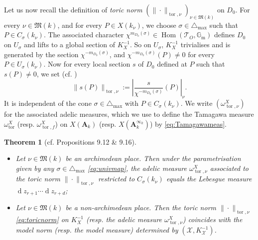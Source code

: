 \documentclass[11pt,letterpaper]{amsart}
\newcommand{\BG}{{\mathbb {G}}}
\newcommand{\CT}{{\mathcal {T}}}
\newcommand{\CX}{{\mathcal {X}}}
\newcommand{\RA}{{\mathbf {A}}}
\newcommand{\Hom}{\operatorname{Hom}}
\theoremstyle{plain}
\numberwithin{equation}{section}
\newtheorem{theorem}{Theorem}[section]
\theoremstyle{definition}
\theoremstyle{remark}
\begin{document}
Let us now recall the definition of \emph{toric norm} $(\|\cdot\|_{\operatorname{tor},\nu})_{\nu\in\mathfrak{M}(k)}$ on $D_0$.
For every $\nu\in\mathfrak{M}(k)$, and for every $P\in X(k_\nu)$, we choose $\sigma\in\triangle_{\max}$ such that $P\in C_\sigma(k_\nu)$. The associated character $\chi^{m_{D_0}(\sigma)}\in\Hom(\CT_{O},\BG_{\operatorname{m}})$ defines $D_0$ on $U_\sigma$ and lifts to a global section of $K_X^{-1}$. So on $U_\sigma$, $K_X^{-1}$ trivialises and is generated by the section $\chi^{-m_{D_0}(\sigma)}$, and $\chi^{-m_{D_0}(\sigma)}(P)\neq 0$ for every $P\in U_\sigma(k_\nu)$. Now for every local section $s$ of $D_0$ defined at $P$ such that $s(P)\neq 0$, we set (cf. \cite[Proposition 9.2]{Salberger})
\begin{equation}\label{eq:toricnorm}
	\|s(P)\|_{\operatorname{tor},\nu}:=\left|\frac{s}{\chi^{-m_{D_0}(\sigma)}}(P)\right|_\nu.
\end{equation}
It is independent of the cone $\sigma\in\triangle_{\max}$ with $P\in C_\sigma(k_\nu)$.
We write $(\omega^X_{\operatorname{tor},\nu})$ for the associated adelic measures, which we use to define the Tamagawa measure $\omega^X_{\operatorname{tor}}$ (resp. $\omega^X_{\operatorname{tor},f}$) on $X(\RA_k)$ (resp. $X(\RA_k^{\infty_k})$) by \eqref{eq:Tamagawameas}.

\begin{theorem}[cf. \cite{Salberger} Propositions 9.12 \& 9.16]\label{thm:realTamagawameas}
	\hfill	\begin{itemize}
		\item 	Let $\nu\in\mathfrak{M}(k)$ be an archimedean place. Then  under the parametrisation given by any $\sigma\in\triangle_{\max}$ \eqref{eq:univmap}, the adelic measure $\omega^X_{\operatorname{tor},\nu}$ associated to the toric norm $\|\cdot\|_{\operatorname{tor},\nu}$ restricted to $C_\sigma(k_\nu)$ equals the Lebesgue measure $\operatorname{d}z_{r+1}\cdots\operatorname{d}z_{r+d}$;
		\item 	Let $\nu\in\mathfrak{M}(k)$ be a non-archimedean place. Then the toric norm $\|\cdot\|_{\operatorname{tor},\nu}$ \eqref{eq:toricnorm} on $K_X^{-1}$ (resp. the adelic measure $\omega^X_{\operatorname{tor},\nu}$) coincides with the model norm (resp. the model measure) determined by $(\CX,K_{\CX}^{-1})$.
	\end{itemize}
\end{theorem}
\end{document}
